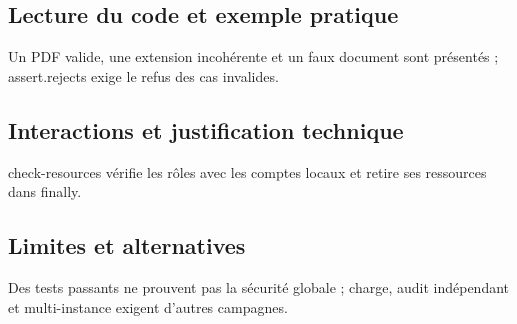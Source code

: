 \subsection*{Lecture du code et exemple pratique}
Un PDF valide, une extension incohérente et un faux document sont présentés ; assert.rejects exige le refus des cas invalides.

\subsection*{Interactions et justification technique}
check-resources vérifie les rôles avec les comptes locaux et retire ses ressources dans finally.

\subsection*{Limites et alternatives}
Des tests passants ne prouvent pas la sécurité globale ; charge, audit indépendant et multi-instance exigent d’autres campagnes.

